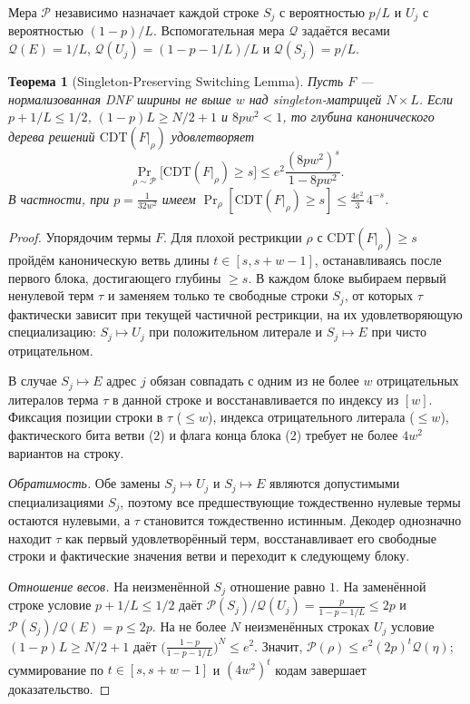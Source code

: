 \documentclass[11pt,a4paper]{article}
\newtheorem{theorem}{Теорема}[section]
\theoremstyle{definition}
\theoremstyle{remark}
\newcommand{\CDT}{\mathrm{CDT}}
\newcommand{\Prb}{\Pr}
\begin{document}
Мера $\mathcal{P}$ независимо назначает каждой строке $S_j$ с вероятностью $p/L$ и $U_j$ с вероятностью $(1-p)/L$. Вспомогательная мера $\mathcal{Q}$ задаётся весами $\mathcal{Q}(E) = 1/L$, $\mathcal{Q}(U_j) = (1 - p - 1/L)/L$ и $\mathcal{Q}(S_j) = p/L$.

\begin{theorem}[Singleton-Preserving Switching Lemma]
\label{thm:singleton-switching-ru}
Пусть $F$ — нормализованная DNF ширины не выше $w$ над singleton-матрицей $N \times L$. Если $p + 1/L \le 1/2$, $(1 - p)L \ge N/2 + 1$ и $8pw^2 < 1$, то глубина канонического дерева решений $\CDT(F|_\rho)$ удовлетворяет
\[
  \Prb_{\rho \sim \mathcal{P}}\bigl[\CDT(F|_\rho) \ge s\bigr]
  \le e^2 \frac{(8pw^2)^s}{1 - 8pw^2}.
\]
В частности, при $p = \frac{1}{32w^2}$ имеем $\Prb_\rho[\CDT(F|_\rho) \ge s] \le \frac{4e^2}{3}\, 4^{-s}$.
\end{theorem}

\begin{proof}
Упорядочим термы $F$. Для плохой рестрикции $\rho$ с $\CDT(F|_\rho) \ge s$ пройдём каноническую ветвь длины $t \in [s, s+w-1]$, останавливаясь после первого блока, достигающего глубины $\ge s$. В каждом блоке выбираем первый ненулевой терм $\tau$ и заменяем только те свободные строки $S_j$, от которых $\tau$ фактически зависит при текущей частичной рестрикции, на их удовлетворяющую специализацию: $S_j \mapsto U_j$ при положительном литерале и $S_j \mapsto E$ при чисто отрицательном.

В случае $S_j \mapsto E$ адрес $j$ обязан совпадать с одним из не более $w$ отрицательных литералов терма $\tau$ в данной строке и восстанавливается по индексу из $[w]$. Фиксация позиции строки в $\tau$ ($\le w$), индекса отрицательного литерала ($\le w$), фактического бита ветви ($2$) и флага конца блока ($2$) требует не более $4w^2$ вариантов на строку.

\emph{Обратимость.} Обе замены $S_j \mapsto U_j$ и $S_j \mapsto E$ являются допустимыми специализациями $S_j$, поэтому все предшествующие тождественно нулевые термы остаются нулевыми, а $\tau$ становится тождественно истинным. Декодер однозначно находит $\tau$ как первый удовлетворённый терм, восстанавливает его свободные строки и фактические значения ветви и переходит к следующему блоку.

\emph{Отношение весов.} На неизменённой $S_j$ отношение равно $1$. На заменённой строке условие $p + 1/L \le 1/2$ даёт $\mathcal{P}(S_j)/\mathcal{Q}(U_j) = \frac{p}{1 - p - 1/L} \le 2p$ и $\mathcal{P}(S_j)/\mathcal{Q}(E) = p \le 2p$. На не более $N$ неизменённых строках $U_j$ условие $(1-p)L \ge N/2 + 1$ даёт $\bigl(\frac{1-p}{1-p-1/L}\bigr)^N \le e^2$. Значит, $\mathcal{P}(\rho) \le e^2 (2p)^t \mathcal{Q}(\eta)$; суммирование по $t \in [s, s+w-1]$ и $(4w^2)^t$ кодам завершает доказательство.
\end{proof}
\end{document}
